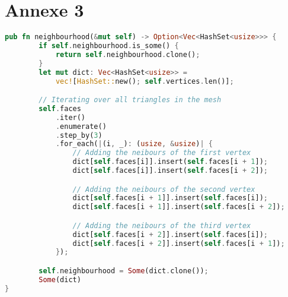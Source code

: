 \chapter*{Annexe 3}

\begin{lstlisting}[language=Rust, style=boxed]
pub fn neighbourhood(&mut self) -> Option<Vec<HashSet<usize>>> {
        if self.neighbourhood.is_some() {
            return self.neighbourhood.clone();
        }
        let mut dict: Vec<HashSet<usize>> = 
            vec![HashSet::new(); self.vertices.len()];

        // Iterating over all triangles in the mesh
        self.faces
            .iter()
            .enumerate()
            .step_by(3)
            .for_each(|(i, _): (usize, &usize)| {
                // Adding the neibours of the first vertex
                dict[self.faces[i]].insert(self.faces[i + 1]);
                dict[self.faces[i]].insert(self.faces[i + 2]);

                // Adding the neibours of the second vertex
                dict[self.faces[i + 1]].insert(self.faces[i]);
                dict[self.faces[i + 1]].insert(self.faces[i + 2]);

                // Adding the neibours of the third vertex
                dict[self.faces[i + 2]].insert(self.faces[i]);
                dict[self.faces[i + 2]].insert(self.faces[i + 1]);
            });

        self.neighbourhood = Some(dict.clone());
        Some(dict)
}
\end{lstlisting}

\stopcontents[annexes]
\resumecontents[default]
